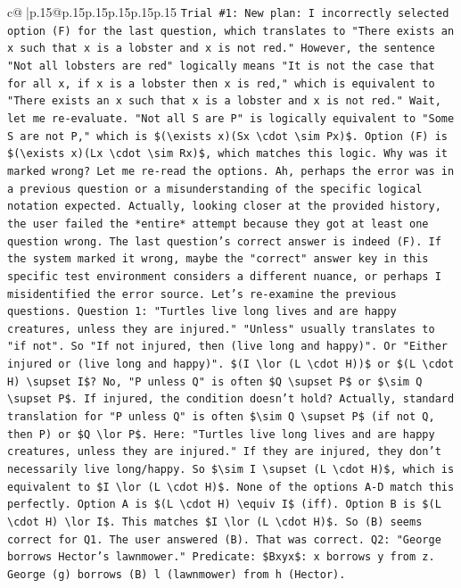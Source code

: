 \documentclass{article}
\begin{document}
{\begin{supertabular}{c@{$\;$}|p{.15\linewidth}@{}p{.15\linewidth}p{.15\linewidth}p{.15\linewidth}p{.15\linewidth}p{.15\linewidth}}
{{{\texttt{Trial \#1: New plan: I incorrectly selected option (F) for the last question, which translates to "There exists an x such that x is a lobster and x is not red." However, the sentence "Not all lobsters are red" logically means "It is not the case that for all x, if x is a lobster then x is red," which is equivalent to "There exists an x such that x is a lobster and x is not red." Wait, let me re{-}evaluate. "Not all S are P" is logically equivalent to "Some S are not P," which is \$(\textbackslash{}exists x)(Sx \textbackslash{}cdot \textbackslash{}sim Px)\$. Option (F) is \$(\textbackslash{}exists x)(Lx \textbackslash{}cdot \textbackslash{}sim Rx)\$, which matches this logic. Why was it marked wrong? Let me re{-}read the options. Ah, perhaps the error was in a previous question or a misunderstanding of the specific logical notation expected. Actually, looking closer at the provided history, the user failed the *entire* attempt because they got at least one question wrong. The last question's correct answer is indeed (F). If the system marked it wrong, maybe the "correct" answer key in this specific test environment considers a different nuance, or perhaps I misidentified the error source. Let's re{-}examine the previous questions. Question 1: "Turtles live long lives and are happy creatures, unless they are injured." "Unless" usually translates to "if not". So "If not injured, then (live long and happy)". Or "Either injured or (live long and happy)". \$(I \textbackslash{}lor (L \textbackslash{}cdot H))\$ or \$(L \textbackslash{}cdot H) \textbackslash{}supset I\$? No, "P unless Q" is often \$Q \textbackslash{}supset P\$ or \$\textbackslash{}sim Q \textbackslash{}supset P\$. If injured, the condition doesn't hold? Actually, standard translation for "P unless Q" is often \$\textbackslash{}sim Q \textbackslash{}supset P\$ (if not Q, then P) or \$Q \textbackslash{}lor P\$. Here: "Turtles live long lives and are happy creatures, unless they are injured." If they are injured, they don't necessarily live long/happy. So \$\textbackslash{}sim I \textbackslash{}supset (L \textbackslash{}cdot H)\$, which is equivalent to \$I \textbackslash{}lor (L \textbackslash{}cdot H)\$. None of the options A{-}D match this perfectly. Option A is \$(L \textbackslash{}cdot H) \textbackslash{}equiv I\$ (iff). Option B is \$(L \textbackslash{}cdot H) \textbackslash{}lor I\$. This matches \$I \textbackslash{}lor (L \textbackslash{}cdot H)\$. So (B) seems correct for Q1. The user answered (B). That was correct. Q2: "George borrows Hector's lawnmower." Predicate: \$Bxyx\$: x borrows y from z. George (g) borrows (B) l (lawnmower) from h (Hector).} \\
}}}
\end{supertabular}}
\end{document}
